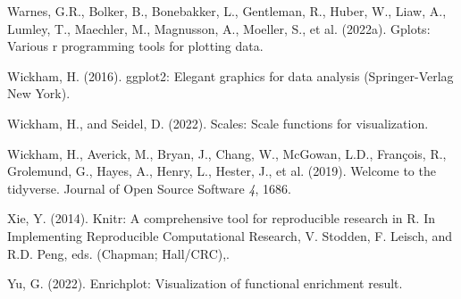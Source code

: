 \documentclass[
  parskip,
  oneside]{scrreprt}
\newlength{\cslhangindent}
\newlength{\cslentryspacingunit} %
\newenvironment{CSLReferences}[2] %
 {%
  \setlength{\parindent}{0pt}
  \ifodd #1
  \let\oldpar\par
  \def\par{\hangindent=\cslhangindent\oldpar}
  \fi
  \setlength{\parskip}{#2\cslentryspacingunit}
 }%
 {}
\begin{document}
\begin{CSLReferences}{0}{0}
\leavevmode{}%
Warnes, G.R., Bolker, B., Bonebakker, L., Gentleman, R., Huber, W.,
Liaw, A., Lumley, T., Maechler, M., Magnusson, A., Moeller, S., et al.
(2022a). Gplots: Various r programming tools for plotting data.

\leavevmode{}%
Wickham, H. (2016). ggplot2: Elegant graphics for data analysis
(Springer-Verlag New York).

\leavevmode{}%
Wickham, H., and Seidel, D. (2022). Scales: Scale functions for
visualization.

\leavevmode{}%
Wickham, H., Averick, M., Bryan, J., Chang, W., McGowan, L.D., François,
R., Grolemund, G., Hayes, A., Henry, L., Hester, J., et al. (2019).
Welcome to the {tidyverse}. Journal of Open Source Software \emph{4},
1686.

\leavevmode{}%
Xie, Y. (2014). Knitr: A comprehensive tool for reproducible research in
{R}. In Implementing Reproducible Computational Research, V. Stodden, F.
Leisch, and R.D. Peng, eds. (Chapman; Hall/CRC),.

\leavevmode{}%
Yu, G. (2022). Enrichplot: Visualization of functional enrichment
result.

\end{CSLReferences}
\end{document}
